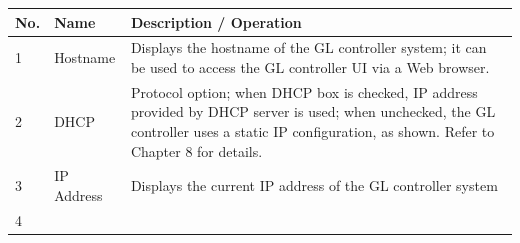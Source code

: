 \begin{longtable}[]{@{}lll@{}}
\toprule
\begin{minipage}[b]{0.04\columnwidth}\raggedright
No.\strut
\end{minipage} & \begin{minipage}[b]{0.23\columnwidth}\raggedright
Name\strut
\end{minipage} & \begin{minipage}[b]{0.65\columnwidth}\raggedright
Description / Operation\strut
\end{minipage}\tabularnewline
\midrule
\endhead
\begin{minipage}[t]{0.04\columnwidth}\raggedright
1\strut
\end{minipage} & \begin{minipage}[t]{0.23\columnwidth}\raggedright
Hostname\strut
\end{minipage} & \begin{minipage}[t]{0.65\columnwidth}\raggedright
Displays the hostname of the GL controller system; it can be used to
access the GL controller UI via a Web browser.\strut
\end{minipage}\tabularnewline
\begin{minipage}[t]{0.04\columnwidth}\raggedright
2\strut
\end{minipage} & \begin{minipage}[t]{0.23\columnwidth}\raggedright
DHCP\strut
\end{minipage} & \begin{minipage}[t]{0.65\columnwidth}\raggedright
Protocol option; when DHCP box is checked, IP address provided by DHCP
server is used; when unchecked, the GL controller uses a static IP
configuration, as shown. Refer to Chapter 8 for details.\strut
\end{minipage}\tabularnewline
\begin{minipage}[t]{0.04\columnwidth}\raggedright
3\strut
\end{minipage} & \begin{minipage}[t]{0.23\columnwidth}\raggedright
IP Address\strut
\end{minipage} & \begin{minipage}[t]{0.65\columnwidth}\raggedright
Displays the current IP address of the GL controller system\strut
\end{minipage}\tabularnewline
\begin{minipage}[t]{0.04\columnwidth}\raggedright
4\strut
\end{minipage} & \begin{minipage}[t]{0.23\columnwidth}\raggedright

\end{minipage}
\end{longtable}
